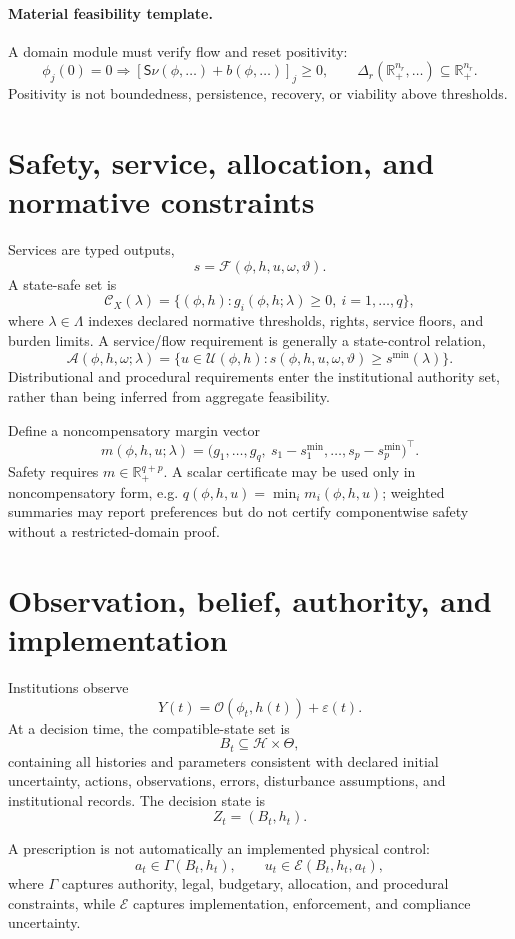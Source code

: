 \documentclass[11pt]{article}
\begin{document}
\paragraph{Material feasibility template.} A domain module must verify flow and reset positivity:
\[
\phi_j(0)=0\Rightarrow[\mathsf S\nu(\phi,\ldots)+b(\phi,\ldots)]_j\ge0,
\qquad
\Delta_r(\mathbb R_+^{n_r},\ldots)\subseteq\mathbb R_+^{n_r}.
\]
Positivity is not boundedness, persistence, recovery, or viability above thresholds.

\section{Safety, service, allocation, and normative constraints}
Services are typed outputs,
\[
s=\mathcal F(\phi,h,u,\omega,\vartheta).
\]
A state-safe set is
\[
\mathcal C_X(\lambda)=\{(\phi,h):g_i(\phi,h;\lambda)\ge0,\ i=1,\ldots,q\},
\]
where $\lambda\in\Lambda$ indexes declared normative thresholds, rights, service floors, and burden limits. A service/flow requirement is generally a state-control relation,
\[
\mathcal A(\phi,h,\omega;\lambda)=\{u\in\mathcal U(\phi,h):s(\phi,h,u,\omega,\vartheta)\ge s^{\min}(\lambda)\}.
\]
Distributional and procedural requirements enter the institutional authority set, rather than being inferred from aggregate feasibility.

Define a noncompensatory margin vector
\[
m(\phi,h,u;\lambda)=\bigl(g_1,\ldots,g_q,\ s_1-s_1^{\min},\ldots,s_p-s_p^{\min}\bigr)^\top.
\]
Safety requires $m\in\mathbb R_+^{q+p}$. A scalar certificate may be used only in noncompensatory form, e.g. $q(\phi,h,u)=\min_i m_i(\phi,h,u)$; weighted summaries may report preferences but do not certify componentwise safety without a restricted-domain proof.

\section{Observation, belief, authority, and implementation}
Institutions observe
\[
Y(t)=\mathcal O(\phi_t,h(t))+\varepsilon(t).
\]
At a decision time, the compatible-state set is
\[
B_t\subseteq\mathscr H\times\Theta,
\]
containing all histories and parameters consistent with declared initial uncertainty, actions, observations, errors, disturbance assumptions, and institutional records. The decision state is
\[
Z_t=(B_t,h_t).
\]

A prescription is not automatically an implemented physical control:
\[
a_t\in\Gamma(B_t,h_t),\qquad u_t\in\mathcal E(B_t,h_t,a_t),
\]
where $\Gamma$ captures authority, legal, budgetary, allocation, and procedural constraints, while $\mathcal E$ captures implementation, enforcement, and compliance uncertainty.
\end{document}
